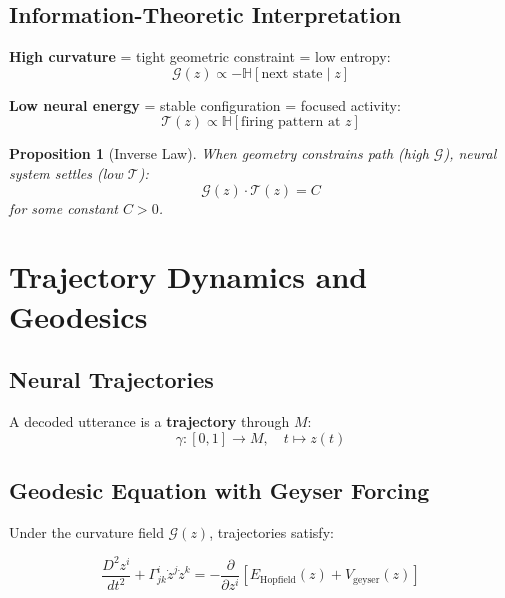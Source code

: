 \documentclass[12pt]{article}
\newtheorem{proposition}{Proposition}
\begin{document}
\subsection{Information-Theoretic Interpretation}

\textbf{High curvature} = tight geometric constraint = low entropy:
\begin{equation}
\mathcal{G}(z) \propto -\mathbb{H}[\text{next state} \mid z]
\end{equation}

\textbf{Low neural energy} = stable configuration = focused activity:
\begin{equation}
\mathcal{T}(z) \propto \mathbb{H}[\text{firing pattern at } z]
\end{equation}

\begin{proposition}[Inverse Law]
When geometry constrains path (high $\mathcal{G}$), neural system settles (low $\mathcal{T}$):
\begin{equation}
\mathcal{G}(z) \cdot \mathcal{T}(z) = C
\end{equation}
for some constant $C > 0$.
\end{proposition}

\section{Trajectory Dynamics and Geodesics}

\subsection{Neural Trajectories}

A decoded utterance is a \textbf{trajectory} through $M$:
\begin{equation}
\gamma: [0,1] \to M, \quad t \mapsto z(t)
\end{equation}

\subsection{Geodesic Equation with Geyser Forcing}

Under the curvature field $\mathcal{G}(z)$, trajectories satisfy:

\begin{equation}\label{eq:geodesic_geyser}
\boxed{
\frac{D^2 z^i}{dt^2} + \Gamma^i_{jk} \dot{z}^j \dot{z}^k = -\frac{\partial}{\partial z^i}\left[E_{\text{Hopfield}}(z) + V_{\text{geyser}}(z)\right]
}
\end{equation}
\end{document}
